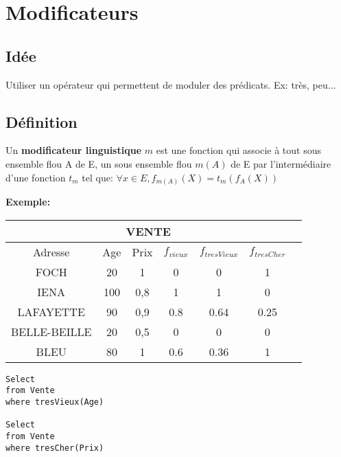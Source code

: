 \documentclass[a4paper,11pt]{article}
\begin{document}
\section{Modificateurs}
\subsection{Idée}
Utiliser un opérateur qui permettent de moduler des prédicats. Ex: très, peu...
\subsection{Définition}
Un \textbf{modificateur linguistique} $m$ est une fonction qui associe à tout sous ensemble flou A de E, un sous ensemble flou $m(A)$ de E par l'intermédiaire d'une fonction $t_m$ tel que:
$\forall x \in E,f_{m(A)}(X)=t_m(f_A(X)) $

\textbf{Exemple:}
\begin{center}

		
\begin{tabular}{|c|c|c|c|c|c|c|}
\hline
\multicolumn{6}{|c|}{VENTE} \\

\hline 
Adresse & Age & Prix & $f_{vieux}$ & $f_{tresVieux}$ & $f_{tresCher}$ \\ 
\hline 
FOCH & 20 & 1 & 0 & 0 & 1\\ 
\hline 
IENA & 100 & 0,8 & 1 & 1 & 0\\ 
\hline 
LAFAYETTE & 90 & 0,9 & 0.8 & 0.64 & 0.25\\ 
\hline 
BELLE-BEILLE & 20 & 0,5 & 0 & 0 & 0\\ 
\hline 
BLEU & 80 & 1 & 0.6 & 0.36 & 1\\ 
\hline 
\end{tabular} 
\end{center}
\begin{verbatim}
Select
from Vente
where tresVieux(Age)

Select
from Vente
where tresCher(Prix)

\end{verbatim}
\end{document}
